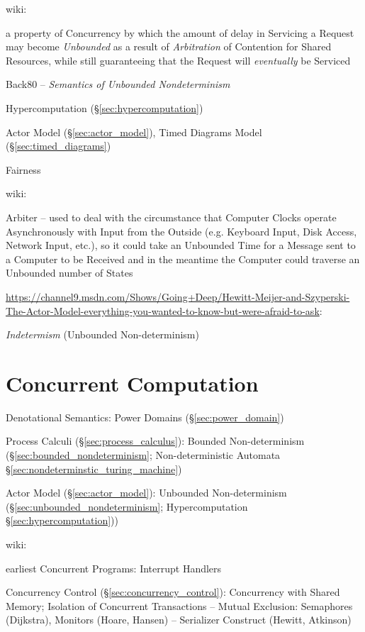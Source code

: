 wiki:

a property of Concurrency by which the amount of delay in Servicing a
Request may become \emph{Unbounded} as a result of \emph{Arbitration}
of Contention for Shared Resources, while still guaranteeing that the
Request will \emph{eventually} be Serviced

Back80 -- \emph{Semantics of Unbounded Nondeterminism}

\fist Hypercomputation (\S\ref{sec:hypercomputation})

\fist Actor Model (\S\ref{sec:actor_model}), Timed Diagrams Model
(\S\ref{sec:timed_diagrams})

Fairness

wiki:

Arbiter -- used to deal with the circumstance that Computer Clocks
operate Asynchronously with Input from the Outside (e.g. Keyboard
Input, Disk Access, Network Input, etc.), so it could take an
Unbounded Time for a Message sent to a Computer to be Received and in
the meantime the Computer could traverse an Unbounded number of States


\url{https://channel9.msdn.com/Shows/Going+Deep/Hewitt-Meijer-and-Szyperski-The-Actor-Model-everything-you-wanted-to-know-but-were-afraid-to-ask}:

\emph{Indetermism} (Unbounded Non-determinism)



\section{Concurrent Computation}\label{sec:concurrent_computation}

Denotational Semantics: Power Domains (\S\ref{sec:power_domain})

\fist Process Calculi (\S\ref{sec:process_calculus}): Bounded
Non-determinism (\S\ref{sec:bounded_nondeterminism}; \fist
Non-deterministic Automata \S\ref{sec:nondeterminstic_turing_machine})

\fist Actor Model (\S\ref{sec:actor_model}): Unbounded Non-determinism
(\S\ref{sec:unbounded_nondeterminism}; \fist Hypercomputation
\S\ref{sec:hypercomputation}))

wiki:

earliest Concurrent Programs: Interrupt Handlers %

Concurrency Control (\S\ref{sec:concurrency_control}): Concurrency
with Shared Memory; Isolation of Concurrent Transactions -- Mutual
Exclusion: Semaphores (Dijkstra), Monitors (Hoare, Hansen) --
Serializer Construct (Hewitt, Atkinson)



